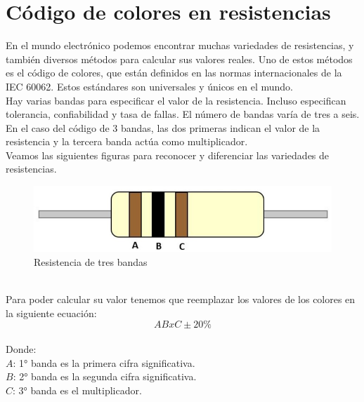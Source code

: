 \section{Código de colores en resistencias}
En el mundo electrónico podemos encontrar muchas variedades de resistencias, y también diversos métodos para calcular sus valores reales. Uno de estos métodos es el código de colores,  que están definidos en las normas internacionales de la IEC 60062. Estos estándares son universales y únicos en el mundo.\\
Hay varias bandas para especificar el valor de la resistencia. Incluso especifican tolerancia, confiabilidad y tasa de fallas. El número de bandas varía de tres a seis. En el caso del código de 3 bandas, las dos primeras indican el valor de la resistencia y la tercera banda actúa como multiplicador.\\
Veamos las siguientes figuras para reconocer y diferenciar las variedades de resistencias.\\
\begin{figure}[h]
	\centering 
	\includegraphics[width=15cm]{imagenes/tresbandas}
	\caption{Resistencia de tres bandas}
\end{figure}\\
Para poder calcular su valor tenemos que reemplazar los valores de los colores en la siguiente ecuación:\\
\begin{equation*}
	ABxC \pm 20\%
\end{equation*}\\
Donde: \\
$ A $: 1° banda es la primera cifra significativa.\\
$ B $: 2° banda es la segunda cifra significativa.\\
$ C $: 3° banda es el multiplicador.\\


